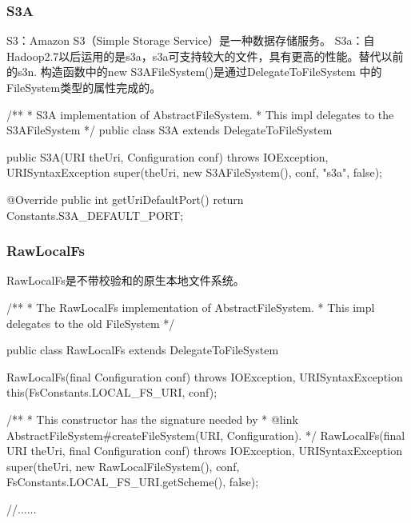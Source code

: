 \subsubsection{S3A}
S3：Amazon S3（Simple Storage Service）是一种数据存储服务。
S3a：自Hadoop2.7以后运用的是s3a，s3a可支持较大的文件，具有更高的性能。替代以前的s3n.
构造函数中的new S3AFileSystem()是通过DelegateToFileSystem 中的FileSystem类型的属性完成的。
\begin{java}
/**
 * S3A implementation of AbstractFileSystem.
 * This impl delegates to the S3AFileSystem
 */
public class S3A extends DelegateToFileSystem{

  public S3A(URI theUri, Configuration conf)
          throws IOException, URISyntaxException {
    super(theUri, new S3AFileSystem(), conf, "s3a", false);
  }

  @Override
  public int getUriDefaultPort() {
    return Constants.S3A_DEFAULT_PORT;
  }
}
\end{java}

\subsubsection{RawLocalFs}
RawLocalFs是不带校验和的原生本地文件系统。
\begin{java}
/**
 * The RawLocalFs implementation of AbstractFileSystem.
 *  This impl delegates to the old FileSystem
 */

public class RawLocalFs extends DelegateToFileSystem {

  RawLocalFs(final Configuration conf) throws IOException, URISyntaxException {
    this(FsConstants.LOCAL_FS_URI, conf);
  }

  /**
   * This constructor has the signature needed by
   * {@link AbstractFileSystem#createFileSystem(URI, Configuration)}.
   */
  RawLocalFs(final URI theUri, final Configuration conf) throws IOException,
      URISyntaxException {
    super(theUri, new RawLocalFileSystem(), conf,
        FsConstants.LOCAL_FS_URI.getScheme(), false);
  }

  //......
}
\end{java}

